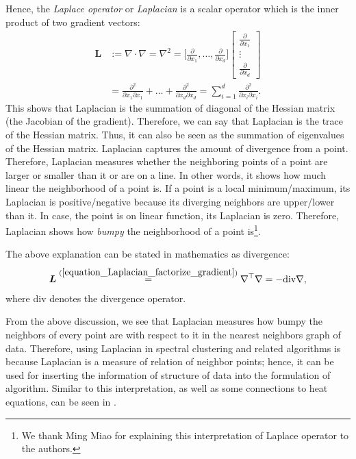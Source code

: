 \documentclass[lang=cn,10pt]{gorgeousnbook}
\numberwithin{equation}{section}%
\numberwithin{figure}{section}%
\begin{document}
Hence, the \textit{Laplace operator} or \textit{Laplacian} is a scalar operator which is the inner product of two gradient vectors:
\begin{equation}
\begin{aligned}
\boldsymbol{L} &:= \nabla \cdot \nabla = \nabla^2 = \Big[\frac{\partial}{\partial x_1}, \dots, \frac{\partial}{\partial x_d}\Big]
\begin{bmatrix}
    \frac{\partial}{\partial x_1} \\
    \vdots \\
    \frac{\partial}{\partial x_d} 
\end{bmatrix} \\
&= \frac{\partial^2}{\partial x_1 \partial x_1} + \dots + \frac{\partial^2}{\partial x_d \partial x_d} = \sum_{i=1}^d \frac{\partial^2}{\partial x_i \partial x_i}.
\end{aligned}
\end{equation}
This shows that Laplacian is the summation of diagonal of the Hessian matrix (the Jacobian of the gradient). Therefore, we can say that Laplacian is the trace of the Hessian matrix. Thus, it can also be seen as the summation of eigenvalues of the Hessian matrix.
Laplacian captures the amount of divergence from a point.
Therefore, Laplacian measures whether the neighboring points of a point are larger or smaller than it or are on a line. In other words, it shows how much linear the neighborhood of a point is. If a point is a local minimum/maximum, its Laplacian is positive/negative because its diverging neighbors are upper/lower than it. In case, the point is on linear function, its Laplacian is zero.
Therefore, Laplacian shows how \textit{bumpy} the neighborhood of a point is\footnote{We thank Ming Miao for explaining this interpretation of Laplace operator to the authors.}.

The above explanation can be stated in mathematics as divergence:
\begin{align}
\boldsymbol{L} \overset{(\ref{equation_Laplacian_factorize_gradient})}{=} \nabla^\top \nabla = -\text{div} \nabla,
\end{align}
where div denotes the divergence operator. 

From the above discussion, we see that Laplacian measures how bumpy the neighbors of every point are with respect to it in the nearest neighbors graph of data. Therefore, using Laplacian in spectral clustering and related algorithms is because Laplacian is a measure of relation of neighbor points; hence, it can be used for inserting the information of structure of data into the formulation of algorithm. Similar to this interpretation, as well as some connections to heat equations, can be seen in \cite{belkin2005towards}.
\end{document}
